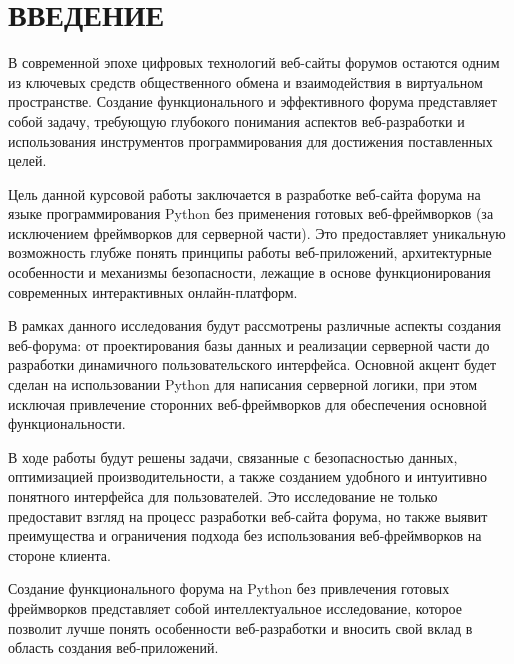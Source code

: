 \section*{ВВЕДЕНИЕ}

В современной эпохе цифровых технологий веб-сайты форумов остаются одним из ключевых средств общественного обмена и взаимодействия в виртуальном пространстве. Создание функционального и эффективного форума представляет собой задачу, требующую глубокого понимания аспектов веб-разработки и использования инструментов программирования для достижения поставленных целей.

Цель данной курсовой работы заключается в разработке веб-сайта форума на языке программирования Python без применения готовых веб-фреймворков (за исключением фреймворков для серверной части). Это предоставляет уникальную возможность глубже понять принципы работы веб-приложений, архитектурные особенности и механизмы безопасности, лежащие в основе функционирования современных интерактивных онлайн-платформ.

В рамках данного исследования будут рассмотрены различные аспекты создания веб-форума: от проектирования базы данных и реализации серверной части до разработки динамичного пользовательского интерфейса. Основной акцент будет сделан на использовании Python для написания серверной логики, при этом исключая привлечение сторонних веб-фреймворков для обеспечения основной функциональности.

В ходе работы будут решены задачи, связанные с безопасностью данных, оптимизацией производительности, а также созданием удобного и интуитивно понятного интерфейса для пользователей. Это исследование не только предоставит взгляд на процесс разработки веб-сайта форума, но также выявит преимущества и ограничения подхода без использования веб-фреймворков на стороне клиента.

Создание функционального форума на Python без привлечения готовых фреймворков представляет собой интеллектуальное исследование, которое позволит лучше понять особенности веб-разработки и вносить свой вклад в область создания веб-приложений.


